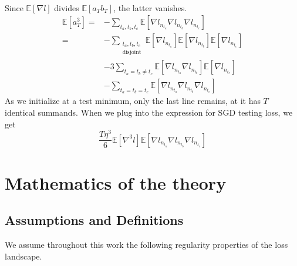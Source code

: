 \documentclass[anon,12pt]{colt2021} %
\newcommand{\expct}[1]{\mathbb{E}\left[#1\right]}
\begin{document}
{\begin{shaded}
\begin{align*}
                \end{align*}
                Since $\expct{\nabla l}$ divides $\expct{a_T b_T}$, the latter
                vanishes.
                \begin{align*}
                    \expct{a_T^3}
                        =&- \sum_{t_a, t_b, t_c}
                                \expct{\nabla l_{n_{t_a}} \nabla l_{n_{t_b}} \nabla l_{n_{t_c}}}
                        \\
                        =&- \sum_{\substack{t_a, t_b, t_c\\ \text{disjoint}}}  
                                \expct{\nabla l_{n_{t_a}}} \expct{\nabla l_{n_{t_b}}} \expct{\nabla l_{n_{t_c}}}
                        \\&-3 \sum_{t_a=t_b\neq t_c}  
                                \expct{\nabla l_{n_{t_a}} \nabla l_{n_{t_b}}} \expct{\nabla l_{n_{t_c}}}
                        \\&-\sum_{t_a=t_b=t_c}  
                                \expct{\nabla l_{n_{t_a}} \nabla l_{n_{t_b}} \nabla l_{n_{t_c}}}
                \end{align*}
                As we initialize at a test minimum, only the last line remains, at
                it has $T$ identical summands.
                When we plug into the expression for SGD testing loss, we get
                $$
                    \frac{T \eta^3 }{6}
                    \expct{\nabla^3 l}
                    \expct{\nabla l_{n_{t_a}} \nabla l_{n_{t_b}} \nabla l_{n_{t_c}}}
                $$
            \end{shaded}




\newpage
\section{Mathematics of the theory}\label{appendix:math}
    \subsection{Assumptions and Definitions}                        \label{appendix:assumptions}
        We assume throughout this work the following regularity properties of
        the loss landscape.
        
}
\end{document}
